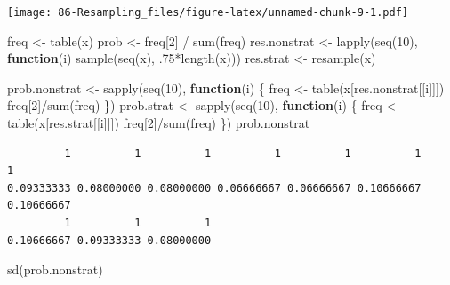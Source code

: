 \documentclass[
]{book}
\newenvironment{Shaded}{\begin{snugshade}}{\end{snugshade}}
\newcommand{\ControlFlowTok}[1]{\textcolor[rgb]{0.13,0.29,0.53}{\textbf{#1}}}
\newcommand{\DecValTok}[1]{\textcolor[rgb]{0.00,0.00,0.81}{#1}}
\newcommand{\FunctionTok}[1]{\textcolor[rgb]{0.00,0.00,0.00}{#1}}
\newcommand{\NormalTok}[1]{#1}
\newcommand{\OtherTok}[1]{\textcolor[rgb]{0.56,0.35,0.01}{#1}}
\newcommand{\SpecialCharTok}[1]{\textcolor[rgb]{0.00,0.00,0.00}{#1}}
\begin{document}
\texttt{[image: 86-Resampling\_files/figure-latex/unnamed-chunk-9-1.pdf]}

\begin{Shaded}
\begin{Highlighting}[]
\NormalTok{freq }\OtherTok{\textless{}{-}} \FunctionTok{table}\NormalTok{(x)}
\NormalTok{prob }\OtherTok{\textless{}{-}}\NormalTok{ freq[}\DecValTok{2}\NormalTok{] }\SpecialCharTok{/} \FunctionTok{sum}\NormalTok{(freq)}
\NormalTok{res.nonstrat }\OtherTok{\textless{}{-}} \FunctionTok{lapply}\NormalTok{(}\FunctionTok{seq}\NormalTok{(}\DecValTok{10}\NormalTok{), }\ControlFlowTok{function}\NormalTok{(i) }\FunctionTok{sample}\NormalTok{(}\FunctionTok{seq}\NormalTok{(x), .}\DecValTok{75}\SpecialCharTok{*}\FunctionTok{length}\NormalTok{(x)))}
\NormalTok{res.strat }\OtherTok{\textless{}{-}} \FunctionTok{resample}\NormalTok{(x)}
\end{Highlighting}
\end{Shaded}

\begin{Shaded}
\begin{Highlighting}[]
\NormalTok{prob.nonstrat }\OtherTok{\textless{}{-}} \FunctionTok{sapply}\NormalTok{(}\FunctionTok{seq}\NormalTok{(}\DecValTok{10}\NormalTok{), }\ControlFlowTok{function}\NormalTok{(i) \{}
\NormalTok{  freq }\OtherTok{\textless{}{-}} \FunctionTok{table}\NormalTok{(x[res.nonstrat[[i]]])}
\NormalTok{  freq[}\DecValTok{2}\NormalTok{]}\SpecialCharTok{/}\FunctionTok{sum}\NormalTok{(freq)}
\NormalTok{\})}
\NormalTok{prob.strat }\OtherTok{\textless{}{-}} \FunctionTok{sapply}\NormalTok{(}\FunctionTok{seq}\NormalTok{(}\DecValTok{10}\NormalTok{), }\ControlFlowTok{function}\NormalTok{(i) \{}
\NormalTok{  freq }\OtherTok{\textless{}{-}} \FunctionTok{table}\NormalTok{(x[res.strat[[i]]])}
\NormalTok{  freq[}\DecValTok{2}\NormalTok{]}\SpecialCharTok{/}\FunctionTok{sum}\NormalTok{(freq)}
\NormalTok{\})}
\NormalTok{prob.nonstrat}
\end{Highlighting}
\end{Shaded}

\begin{verbatim}
         1          1          1          1          1          1          1 
0.09333333 0.08000000 0.08000000 0.06666667 0.06666667 0.10666667 0.10666667 
         1          1          1 
0.10666667 0.09333333 0.08000000 
\end{verbatim}

\begin{Shaded}
\begin{Highlighting}[]
\FunctionTok{sd}\NormalTok{(prob.nonstrat)}
\end{Highlighting}
\end{Shaded}
\end{document}
